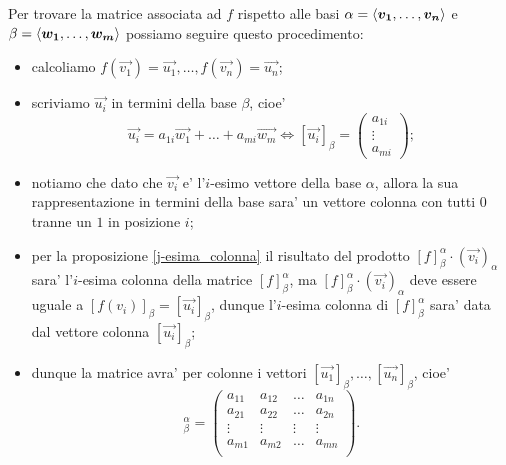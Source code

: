Per trovare la matrice associata ad $f$ rispetto alle basi $\alpha = \left\langle \bm{v_1}, \dots, \bm{v_n} \right\rangle$ e $\beta = \left\langle \bm{w_1}, \dots, \bm{w_m} \right\rangle$ possiamo seguire questo procedimento:
\begin{itemize}
    \item calcoliamo $f(\vec{v_1}) = \vec{u_1}, \dots, f(\vec{v_n}) = \vec{u_n}$;
    \item scriviamo $\vec{u_i}$ in termini della base $\beta$, cioe' \begin{equation*}
        \vec{u_i} = a_{1i}\vec{w_1} + \dots + a_{mi}\vec{w_m} \iff [\vec{u_i}]_{\beta} = \begin{pmatrix}
            a_{1i} \\ \vdots \\ a_{mi}
        \end{pmatrix};
    \end{equation*}
    \item notiamo che dato che $\vec{v_i}$ e' l'$i$-esimo vettore della base $\alpha$, allora la sua rappresentazione in termini della base sara' un vettore colonna con tutti $0$ tranne un $1$ in posizione $i$;
    \item per la proposizione \ref{j-esima_colonna} il risultato del prodotto $[f]^{\alpha}_{\beta} \cdot (\vec{v_i})_{\alpha}$ sara' l'$i$-esima colonna della matrice $[f]^{\alpha}_{\beta}$, ma $[f]^{\alpha}_{\beta} \cdot (\vec{v_i})_{\alpha}$ deve essere uguale a $[f(v_i)]_{\beta} = [\vec{u_i}]_{\beta}$, dunque l'$i$-esima colonna di $[f]^{\alpha}_{\beta}$ sara' data dal vettore colonna $[\vec{u_i}]_{\beta}$;
    \item dunque la matrice avra' per colonne i vettori $[\vec{u_1}]_{\beta}, \dots, [\vec{u_n}]_{\beta}$, cioe'
    \begin{equation}
        [f]^{\alpha}_{\beta} = \begin{pmatrix}
            a_{11} & a_{12} & \dots & a_{1n} \\
            a_{21} & a_{22} & \dots & a_{2n} \\
            \vdots & \vdots & \vdots& \vdots \\
            a_{m1} & a_{m2} & \dots & a_{mn} \\
        \end{pmatrix}.
    \end{equation}
\end{itemize}


